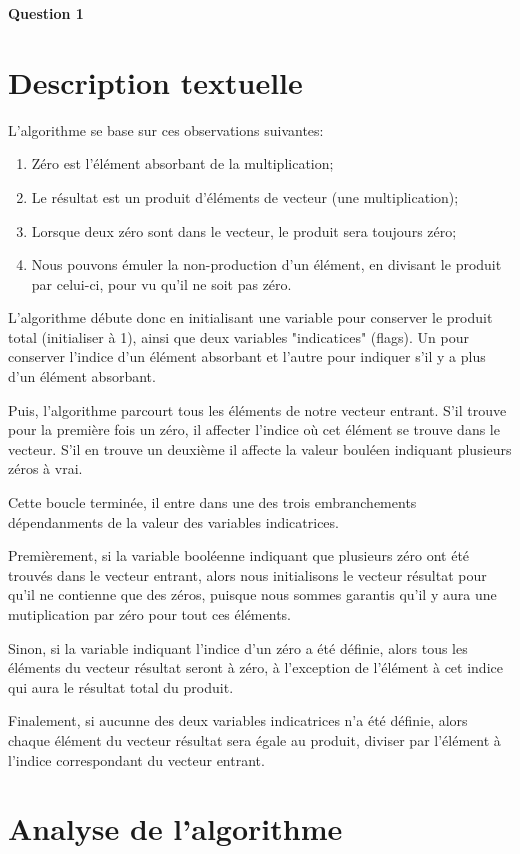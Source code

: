 \documentclass[class=article]{standalone}
\newcommand{\<}[1]{\\\hspace*{-\indentationFormule}\makebox(0,0)[bl]{$#1$}\hspace*{\indentationFormule}}
\begin{document}
\centerline{\Huge \bf Question 1}
\bigskip
\section*{Description textuelle}

L'algorithme se base sur ces observations suivantes:
\begin{enumerate}
    \item Zéro est l'élément absorbant de la multiplication;
    \item Le résultat est un produit d'éléments de vecteur (une multiplication);
    \item Lorsque deux zéro sont dans le vecteur, le produit sera toujours zéro;
    \item Nous pouvons émuler la non-production d'un élément, en divisant le produit par celui-ci, pour vu qu'il ne soit pas zéro.
\end{enumerate}

L'algorithme débute donc en initialisant une variable pour conserver le produit total (initialiser à 1), 
ainsi que deux variables "indicatices" (flags). Un pour conserver l'indice d'un élément absorbant et l'autre pour indiquer s'il y a plus d'un élément absorbant.

Puis, l'algorithme parcourt tous les éléments de notre vecteur entrant. S'il trouve pour la première fois un zéro, il affecter l'indice
où cet élément se trouve dans le vecteur. S'il en trouve un deuxième il affecte la valeur bouléen indiquant plusieurs zéros à vrai. 

Cette boucle terminée, il entre dans une des trois embranchements dépendanments de la valeur des variables indicatrices.

Premièrement, si la variable booléenne indiquant que plusieurs zéro ont été trouvés dans le vecteur entrant,
alors nous initialisons le vecteur résultat pour qu'il ne contienne que des zéros, puisque nous sommes garantis qu'il 
y aura une mutiplication par zéro pour tout ces éléments. 

Sinon, si la variable indiquant l'indice d'un zéro a été définie, alors tous les éléments du vecteur résultat seront
à zéro, à l'exception de l'élément à cet indice qui aura le résultat total du produit.

Finalement, si aucunne des deux variables indicatrices n'a été définie, alors chaque élément du vecteur résultat sera égale au produit, diviser par 
l'élément à l'indice correspondant du vecteur entrant.

\section*{Analyse de l'algorithme}
\end{document}
